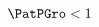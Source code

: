 \begin{equation}\begin{gathered}\begin{aligned}
  \PatPGro &  < 1   \label{eq:GICAbs}
\end{aligned}\end{gathered}\end{equation}
